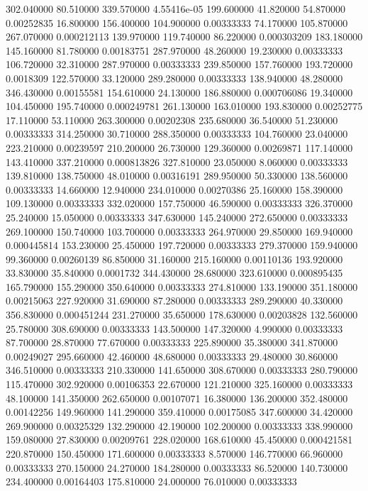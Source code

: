 302.040000	80.510000	339.570000	4.55416e-05
199.600000	41.820000	54.870000	0.00252835
16.800000	156.400000	104.900000	0.00333333
74.170000	105.870000	267.070000	0.000212113
139.970000	119.740000	86.220000	0.000303209
183.180000	145.160000	81.780000	0.00183751
287.970000	48.260000	19.230000	0.00333333
106.720000	32.310000	287.970000	0.00333333
239.850000	157.760000	193.720000	0.0018309
122.570000	33.120000	289.280000	0.00333333
138.940000	48.280000	346.430000	0.00155581
154.610000	24.130000	186.880000	0.000706086
19.340000	104.450000	195.740000	0.000249781
261.130000	163.010000	193.830000	0.00252775
17.110000	53.110000	263.300000	0.00202308
235.680000	36.540000	51.230000	0.00333333
314.250000	30.710000	288.350000	0.00333333
104.760000	23.040000	223.210000	0.00239597
210.200000	26.730000	129.360000	0.00269871
117.140000	143.410000	337.210000	0.000813826
327.810000	23.050000	8.060000	0.00333333
139.810000	138.750000	48.010000	0.00316191
289.950000	50.330000	138.560000	0.00333333
14.660000	12.940000	234.010000	0.00270386
25.160000	158.390000	109.130000	0.00333333
332.020000	157.750000	46.590000	0.00333333
326.370000	25.240000	15.050000	0.00333333
347.630000	145.240000	272.650000	0.00333333
269.100000	150.740000	103.700000	0.00333333
264.970000	29.850000	169.940000	0.000445814
153.230000	25.450000	197.720000	0.00333333
279.370000	159.940000	99.360000	0.00260139
86.850000	31.160000	215.160000	0.00110136
193.920000	33.830000	35.840000	0.0001732
344.430000	28.680000	323.610000	0.000895435
165.790000	155.290000	350.640000	0.00333333
274.810000	133.190000	351.180000	0.00215063
227.920000	31.690000	87.280000	0.00333333
289.290000	40.330000	356.830000	0.000451244
231.270000	35.650000	178.630000	0.00203828
132.560000	25.780000	308.690000	0.00333333
143.500000	147.320000	4.990000	0.00333333
87.700000	28.870000	77.670000	0.00333333
225.890000	35.380000	341.870000	0.00249027
295.660000	42.460000	48.680000	0.00333333
29.480000	30.860000	346.510000	0.00333333
210.330000	141.650000	308.670000	0.00333333
280.790000	115.470000	302.920000	0.00106353
22.670000	121.210000	325.160000	0.00333333
48.100000	141.350000	262.650000	0.00107071
16.380000	136.200000	352.480000	0.00142256
149.960000	141.290000	359.410000	0.00175085
347.600000	34.420000	269.900000	0.00325329
132.290000	42.190000	102.200000	0.00333333
338.990000	159.080000	27.830000	0.00209761
228.020000	168.610000	45.450000	0.000421581
220.870000	150.450000	171.600000	0.00333333
8.570000	146.770000	66.960000	0.00333333
270.150000	24.270000	184.280000	0.00333333
86.520000	140.730000	234.400000	0.00164403
175.810000	24.000000	76.010000	0.00333333
